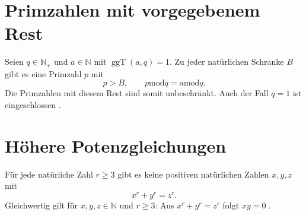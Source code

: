 \section{Primzahlen mit vorgegebenem Rest}

\begin{theorem}
\label{b10guide:thm:dirichlet-prime-remainders}
Seien $q\in\mathbb N_+$ und $a\in\mathbb N$ mit
$\operatorname{ggT}(a,q)=1$. Zu jeder natürlichen Schranke $B$
gibt es eine Primzahl $p$ mit
\[
 p>B,\qquad p\mathbin{\mathrm{mod}}q
                 =a\mathbin{\mathrm{mod}}q.
\]
Die Primzahlen mit diesem Rest sind somit unbeschränkt.
Auch der Fall $q=1$ ist eingeschlossen \cite{natdirichlet}.
\end{theorem}

\section{Höhere Potenzgleichungen}

\begin{theorem}
\label{b10guide:thm:fermat-last}
Für jede natürliche Zahl $r\ge3$ gibt es keine positiven natürlichen
Zahlen $x,y,z$ mit
\[
 x^r+y^r=z^r.
\]
Gleichwertig gilt für $x,y,z\in\mathbb N$ und $r\ge3$:
Aus $x^r+y^r=z^r$ folgt $xy=0$ \cite{natfermatlast}.
\end{theorem}
